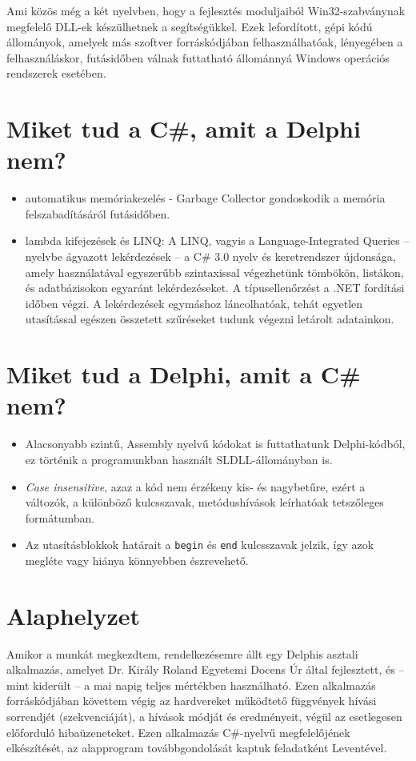 \documentclass[tocnopagenum]{thesis-ekf}
\begin{document}
	Ami közös még a két nyelvben, hogy a fejlesztés moduljaiból Win32-szabványnak megfelelő DLL-ek készülhetnek a segítségükkel. Ezek lefordított, gépi kódú állományok, amelyek más szoftver forráskódjában felhasználhatóak, lényegében a felhasználáskor, futásidőben válnak futtatható állománnyá Windows operációs rendszerek esetében.
	
	\section{Miket tud a C\#, amit a Delphi nem?}
	\begin{itemize}
		\item automatikus memóriakezelés - Garbage Collector gondoskodik a memória felszabadításáról futásidőben.
		\item lambda kifejezések és LINQ: A LINQ, vagyis a Language-Integrated Queries -- nyelvbe ágyazott lekérdezések -- a C\# 3.0 nyelv és keretrendszer újdonsága, amely használatával egyszerűbb szintaxissal végezhetünk tömbökön, listákon, és adatbázisokon egyaránt lekérdezéseket. A típusellenőrzést a .NET fordítási időben végzi. A lekérdezések egymáshoz láncolhatóak, tehát egyetlen utasítással egészen összetett szűréseket tudunk végezni letárolt adatainkon. \cite{linq}
	\end{itemize}
	\section{Miket tud a Delphi, amit a C\# nem?}
	\begin{itemize}
		\item Alacsonyabb szintű, Assembly nyelvű kódokat is futtathatunk Delphi-kódból, ez történik a programunkban használt SLDLL-állományban is.
		\item \emph{Case insensitive}, azaz a kód nem érzékeny kis- és nagybetűre, ezért a változók, a különböző kulcsszavak, metódushívások leírhatóak tetszőleges formátumban.
		\item Az utasításblokkok határait a \verb*|begin| és \verb*|end| kulcsszavak jelzik, így azok megléte vagy hiánya könnyebben észrevehető.\cite{pascal_csharp}
	\end{itemize}
	\section{Alaphelyzet}
	Amikor a munkát megkezdtem, rendelkezésemre állt egy Delphis asztali alkalmazás, amelyet Dr. Király Roland Egyetemi Docens Úr által fejlesztett, és -- mint kiderült -- a mai napig teljes mértékben használható. Ezen alkalmazás forráskódjában követtem végig az hardvereket működtető függvények hívási sorrendjét (szekvenciáját), a hívások módját és eredményeit, végül az esetlegesen előforduló hibaüzeneteket. 
	Ezen alkalmazás C\#-nyelvű megfelelőjének elkészítését, az alapprogram továbbgondolását kaptuk feladatként Leventével. 
	
\end{document}
